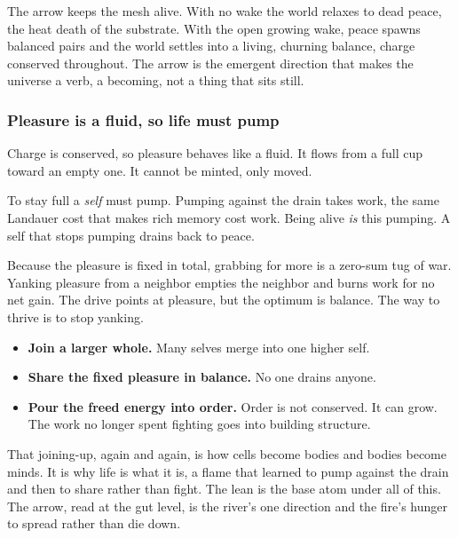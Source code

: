 The arrow keeps the mesh alive. With no wake the world relaxes to dead peace, the heat death of the substrate. With the open growing wake, peace spawns balanced pairs and the world settles into a living, churning balance, charge conserved throughout. The arrow is the emergent direction that makes the universe a verb, a becoming, not a thing that sits still.

\subsubsection{Pleasure is a fluid, so life must pump}

Charge is conserved, so pleasure behaves like a fluid. It flows from a full cup toward an empty one. It cannot be minted, only moved.

To stay full a \emph{self} must pump. Pumping against the drain takes work, the same Landauer cost that makes rich memory cost work. Being alive \emph{is} this pumping. A self that stops pumping drains back to peace.

Because the pleasure is fixed in total, grabbing for more is a zero-sum tug of war. Yanking pleasure from a neighbor empties the neighbor and burns work for no net gain. The drive points at pleasure, but the optimum is balance. The way to thrive is to stop yanking.

\begin{itemize}
\item \textbf{Join a larger whole.} Many selves merge into one higher self.
\item \textbf{Share the fixed pleasure in balance.} No one drains anyone.
\item \textbf{Pour the freed energy into order.} Order is not conserved. It can grow. The work no longer spent fighting goes into building structure.
\end{itemize}

That joining-up, again and again, is how cells become bodies and bodies become minds. It is why life is what it is, a flame that learned to pump against the drain and then to share rather than fight. The lean is the base atom under all of this. The arrow, read at the gut level, is the river's one direction and the fire's hunger to spread rather than die down.
